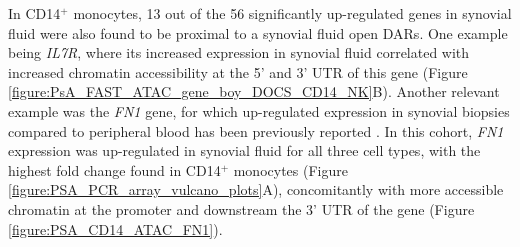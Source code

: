 In CD14$^+$ monocytes, 13 out of the 56 significantly up-regulated genes in synovial fluid were also found to be proximal to a synovial fluid open DARs. One example being \textit{IL7R}, where its increased expression in synovial fluid correlated with increased chromatin accessibility at the 5' and 3' UTR of this gene (Figure \ref{figure:PsA_FAST_ATAC_gene_boy_DOCS_CD14_NK}B). Another relevant example was the \textit{FN1} gene, for which up-regulated expression in synovial biopsies compared to peripheral blood has been previously reported \parencite{Dolcino2015}. In this cohort, \textit{FN1} expression was up-regulated in synovial fluid for all three cell types, with the highest fold change found in CD14$^+$ monocytes (Figure \ref{figure:PSA_PCR_array_vulcano_plots}A), concomitantly with more accessible chromatin at the promoter and downstream the 3' UTR of the gene (Figure \ref{figure:PSA_CD14_ATAC_FN1}). 
	
